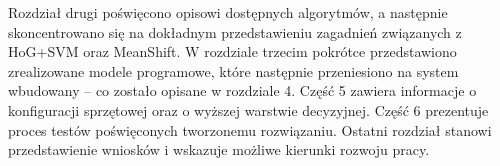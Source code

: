 Rozdział drugi poświęcono opisowi dostępnych algorytmów, a następnie skoncentrowano się na dokładnym przedstawieniu zagadnień związanych z HoG+SVM oraz MeanShift. %
W rozdziale trzecim pokrótce przedstawiono zrealizowane modele programowe, które następnie przeniesiono na system wbudowany -- co zostało opisane w rozdziale 4. 
Część 5 zawiera informacje o konfiguracji sprzętowej oraz o wyższej warstwie decyzyjnej. 
Część 6 prezentuje proces testów poświęconych tworzonemu rozwiązaniu. 
Ostatni rozdział stanowi przedstawienie wniosków i wskazuje możliwe kierunki rozwoju pracy.












